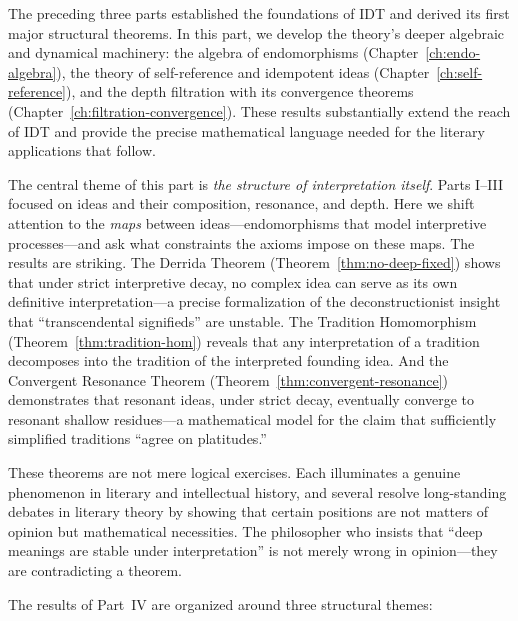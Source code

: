 \documentclass[11pt,openany]{book}
\theoremstyle{definition}
\theoremstyle{plain}
\theoremstyle{remark}
\begin{document}
The preceding three parts established the foundations of IDT and derived its first major structural theorems. In this part, we develop the theory's deeper algebraic and dynamical machinery: the algebra of endomorphisms (Chapter~\ref{ch:endo-algebra}), the theory of self-reference and idempotent ideas (Chapter~\ref{ch:self-reference}), and the depth filtration with its convergence theorems (Chapter~\ref{ch:filtration-convergence}). These results substantially extend the reach of IDT and provide the precise mathematical language needed for the literary applications that follow.

The central theme of this part is \emph{the structure of interpretation itself}. Parts I--III focused on ideas and their composition, resonance, and depth. Here we shift attention to the \emph{maps} between ideas---endomorphisms that model interpretive processes---and ask what constraints the axioms impose on these maps. The results are striking. The Derrida Theorem (Theorem~\ref{thm:no-deep-fixed}) shows that under strict interpretive decay, no complex idea can serve as its own definitive interpretation---a precise formalization of the deconstructionist insight that ``transcendental signifieds'' are unstable. The Tradition Homomorphism (Theorem~\ref{thm:tradition-hom}) reveals that any interpretation of a tradition decomposes into the tradition of the interpreted founding idea. And the Convergent Resonance Theorem (Theorem~\ref{thm:convergent-resonance}) demonstrates that resonant ideas, under strict decay, eventually converge to resonant shallow residues---a mathematical model for the claim that sufficiently simplified traditions ``agree on platitudes.''

These theorems are not mere logical exercises. Each illuminates a genuine phenomenon in literary and intellectual history, and several resolve long-standing debates in literary theory by showing that certain positions are not matters of opinion but mathematical necessities. The philosopher who insists that ``deep meanings are stable under interpretation'' is not merely wrong in opinion---they are contradicting a theorem.

The results of Part~IV are organized around three structural themes:
\end{document}
